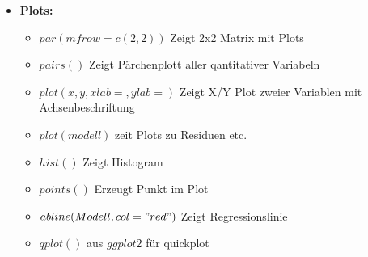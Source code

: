 \documentclass[a4paper]{article}
\begin{document}
\begin{landscape}
\begin{multicols}{3}
\begin{itemize} [noitemsep,nolistsep,leftmargin=*]
            \item \textbf{Plots:}
            \begin{itemize}[noitemsep,nolistsep,leftmargin=*]
                \item $par(mfrow = c(2, 2))$ Zeigt 2x2 Matrix mit Plots
                \item $pairs()$ Zeigt Pärchenplott aller qantitativer Variabeln
                \item $plot(x,y, xlab=, ylab=)$ Zeigt X/Y Plot zweier Variablen mit Achsenbeschriftung
                \item $plot(modell)$ zeit Plots zu Residuen etc.
                \item $hist()$ Zeigt Histogram
                \item $points()$ Erzeugt Punkt im Plot
                \item $abline(Modell, col="red")$ Zeigt Regressionslinie
                \item $qplot()$ aus $ggplot2$ für quickplot
            \end{itemize}
        \end{itemize}
    
    \end{multicols}
    
\end{landscape}
\end{document}

